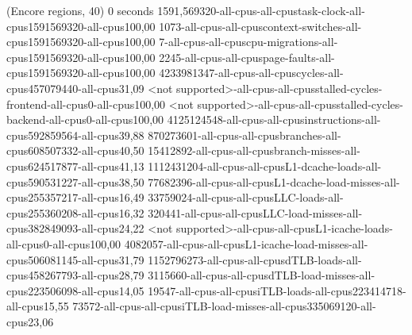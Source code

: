 (Encore regions, 40)
0 seconds
1591,569320-all-cpus-all-cpustask-clock-all-cpus1591569320-all-cpus100,00
1073-all-cpus-all-cpuscontext-switches-all-cpus1591569320-all-cpus100,00
7-all-cpus-all-cpuscpu-migrations-all-cpus1591569320-all-cpus100,00
2245-all-cpus-all-cpuspage-faults-all-cpus1591569320-all-cpus100,00
4233981347-all-cpus-all-cpuscycles-all-cpus457079440-all-cpus31,09
<not supported>-all-cpus-all-cpusstalled-cycles-frontend-all-cpus0-all-cpus100,00
<not supported>-all-cpus-all-cpusstalled-cycles-backend-all-cpus0-all-cpus100,00
4125124548-all-cpus-all-cpusinstructions-all-cpus592859564-all-cpus39,88
870273601-all-cpus-all-cpusbranches-all-cpus608507332-all-cpus40,50
15412892-all-cpus-all-cpusbranch-misses-all-cpus624517877-all-cpus41,13
1112431204-all-cpus-all-cpusL1-dcache-loads-all-cpus590531227-all-cpus38,50
77682396-all-cpus-all-cpusL1-dcache-load-misses-all-cpus255357217-all-cpus16,49
33759024-all-cpus-all-cpusLLC-loads-all-cpus255360208-all-cpus16,32
320441-all-cpus-all-cpusLLC-load-misses-all-cpus382849093-all-cpus24,22
<not supported>-all-cpus-all-cpusL1-icache-loads-all-cpus0-all-cpus100,00
4082057-all-cpus-all-cpusL1-icache-load-misses-all-cpus506081145-all-cpus31,79
1152796273-all-cpus-all-cpusdTLB-loads-all-cpus458267793-all-cpus28,79
3115660-all-cpus-all-cpusdTLB-load-misses-all-cpus223506098-all-cpus14,05
19547-all-cpus-all-cpusiTLB-loads-all-cpus223414718-all-cpus15,55
73572-all-cpus-all-cpusiTLB-load-misses-all-cpus335069120-all-cpus23,06
